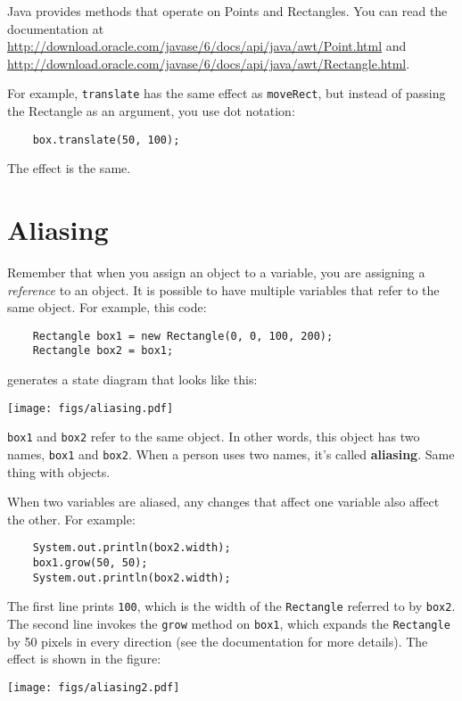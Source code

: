 \documentclass[12pt]{book}
\theoremstyle{definition}
\begin{document}
Java provides methods that operate on Points and Rectangles.  You can
read the documentation at
\url{http://download.oracle.com/javase/6/docs/api/java/awt/Point.html}
and
\url{http://download.oracle.com/javase/6/docs/api/java/awt/Rectangle.html}.

For example, {\tt translate} has the same effect as {\tt moveRect},
but instead of passing the Rectangle as an argument, you use dot
notation:

\begin{lstlisting}
    box.translate(50, 100);
\end{lstlisting}
%
The effect is the same.


\section{Aliasing}
\label{aliasing}

Remember that when you assign an object to a variable, you
are assigning a {\em reference} to an object.  It is possible to have
multiple variables that refer to the same object.  For example,
this code:

\begin{lstlisting}
    Rectangle box1 = new Rectangle(0, 0, 100, 200);
    Rectangle box2 = box1;
\end{lstlisting}
%
generates a state diagram that looks like this:


\texttt{[image: figs/aliasing.pdf]}


{\tt box1} and {\tt box2} refer to the same object.
In other words, this object has two names, {\tt box1} and {\tt box2}.
When a person uses two names, it's called {\bf aliasing}.  Same thing
with objects.

When two variables are aliased, any changes that affect one
variable also affect the other.  For example:

\begin{lstlisting}
    System.out.println(box2.width);
    box1.grow(50, 50);
    System.out.println(box2.width);
\end{lstlisting}
%
The first line prints {\tt 100}, which is the width of the
{\tt Rectangle} referred to by {\tt box2}.  The second
line invokes the {\tt grow} method on {\tt box1}, which
expands the {\tt Rectangle} by 50 pixels in every direction
(see the documentation for more details).  The effect
is shown in the figure:


\texttt{[image: figs/aliasing2.pdf]}
\end{document}
